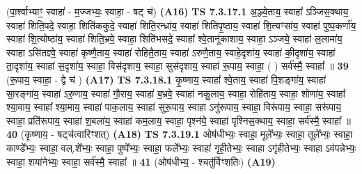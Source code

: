 \documentclass[17pt]{extarticle}
\begin{document}
                  \newline
                      (पा॒र्श्वाभ्याꣳ॒॒ स्वाहा॑ - म॒ज्जभ्यः॒ स्वाहा॒ - षट् च॑)  \textbf{(A16)} \newline \newline
                                        \textbf{ TS 7.3.17.1} \newline
                  अ॒ञ्ज्ये॒ताय॒ स्वाहा᳚ ऽञ्जिस॒क्थाय॒ स्वाहा॑ शिति॒पदे॒ स्वाहा॒ शिति॑ककुदे॒ स्वाहा॑ शिति॒रन्ध्रा॑य॒ स्वाहा॑ शितिपृ॒ष्ठाय॒ स्वाहा॑ शि॒त्यꣳसा॑य॒ स्वाहा॑ पुष्प॒कर्णा॑य॒ स्वाहा॑ शि॒त्योष्ठा॑य॒ स्वाहा॑ शिति॒भ्रवे॒ स्वाहा॒ शिति॑भसदे॒ स्वाहा᳚ श्वे॒तानू॑काशाय॒ स्वाहा॒ ऽञ्जये॒ स्वाहा॑ ल॒लामा॑य॒ स्वाहा ऽसि॑तज्ञ्वे॒ स्वाहा॑ कृष्णै॒ताय॒ स्वाहा॑ रोहितै॒ताय॒ स्वाहा॑ ऽरुणै॒ताय॒ स्वाहे॒दृशा॑य॒ स्वाहा॑ की॒दृशा॑य॒ स्वाहा॑ ता॒दृशा॑य॒ स्वाहा॑ स॒दृशा॑य॒ स्वाहा॒ विस॑दृशाय॒ स्वाहा॒ सुस॑दृशाय॒ स्वाहा॑ रू॒पाय॒ स्वाहा॒ ( ) सर्व॑स्मै॒ स्वाहा᳚ ॥ \textbf{  39} \newline
                  \newline
                      (रू॒पाय॒ स्वाहा॒ - द्वे च॑ )  \textbf{(A17)} \newline \newline
                                        \textbf{ TS 7.3.18.1} \newline
                  कृ॒ष्णाय॒ स्वाहा᳚ श्वे॒ताय॒ स्वाहा॑ पि॒शङ्गा॑य॒ स्वाहा॑ सा॒रङ्गा॑य॒ स्वाहा॑ ऽरु॒णाय॒ स्वाहा॑ गौ॒राय॒ स्वाहा॑ ब॒भ्रवे॒ स्वाहा॑ नकु॒लाय॒ स्वाहा॒ रोहि॑ताय॒ स्वाहा॒ शोणा॑य॒ स्वाहा᳚ श्या॒वाय॒ स्वाहा᳚ श्या॒माय॒ स्वाहा॑ पाक॒लाय॒ स्वाहा॑ सुरू॒पाय॒ स्वाहा ऽनु॑रूपाय॒ स्वाहा॒ विरू॑पाय॒ स्वाहा॒ सरू॑पाय॒ स्वाहा॒ प्रति॑रूपाय॒ स्वाहा॑ श॒बला॑य॒ स्वाहा॑ कम॒लाय॒ स्वाहा॒ पृश्न॑ये॒ स्वाहा॑ पृश्निस॒क्थाय॒ स्वाहा॒ सर्व॑स्मै॒ स्वाहा᳚ ॥ \textbf{  40} \newline
                  \newline
                      (कृ॒ष्णाय॒ - षट्च॑त्वारिꣳशत्)  \textbf{(A18)} \newline \newline
                                        \textbf{ TS 7.3.19.1} \newline
                  ओष॑धीभ्यः॒ स्वाहा॒ मूले᳚भ्यः॒ स्वाहा॒ तूले᳚भ्यः॒ स्वाहा॒ काण्डे᳚भ्यः॒ स्वाहा॒ वल्.शे᳚भ्यः॒ स्वाहा॒ पुष्पे᳚भ्यः॒ स्वाहा॒ फले᳚भ्यः॒ स्वाहा॑ गृही॒तेभ्यः॒ स्वाहा ऽगृ॑हीतेभ्यः॒ स्वाहा ऽव॑पन्नेभ्यः॒ स्वाहा॒ शया॑नेभ्यः॒ स्वाहा॒ सर्व॑स्मै॒ स्वाहा᳚ ॥ \textbf{  41 } \newline
                  \newline
                      (ओष॑धीभ्य॒ - श्चतु॑र्विꣳशतिः)  \textbf{(A19)} \newline \newline
\end{document}
